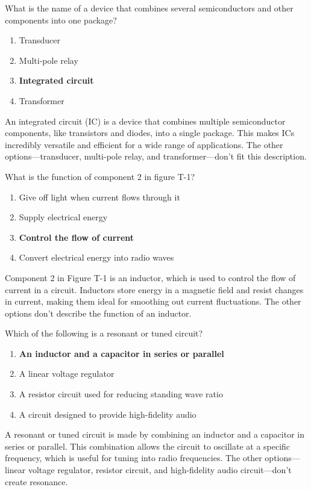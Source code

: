 \begin{tcolorbox}[colback=gray!10!white,colframe=black!75!black,title={T6D09}]
What is the name of a device that combines several semiconductors and other components into one package?
\begin{enumerate}[label=\Alph*),noitemsep]
    \item Transducer
    \item Multi-pole relay
    \item \textbf{Integrated circuit}
    \item Transformer
\end{enumerate}
\end{tcolorbox}
An integrated circuit (IC) is a device that combines multiple semiconductor components, like transistors and diodes, into a single package. This makes ICs incredibly versatile and efficient for a wide range of applications. The other options—transducer, multi-pole relay, and transformer—don’t fit this description.

\begin{tcolorbox}[colback=gray!10!white,colframe=black!75!black,title={T6D10}]
What is the function of component 2 in figure T-1?
\begin{enumerate}[label=\Alph*),noitemsep]
    \item Give off light when current flows through it
    \item Supply electrical energy
    \item \textbf{Control the flow of current}
    \item Convert electrical energy into radio waves
\end{enumerate}
\end{tcolorbox}
Component 2 in Figure T-1 is an inductor, which is used to control the flow of current in a circuit. Inductors store energy in a magnetic field and resist changes in current, making them ideal for smoothing out current fluctuations. The other options don’t describe the function of an inductor.

\begin{tcolorbox}[colback=gray!10!white,colframe=black!75!black,title={T6D11}]
Which of the following is a resonant or tuned circuit?
\begin{enumerate}[label=\Alph*),noitemsep]
    \item \textbf{An inductor and a capacitor in series or parallel}
    \item A linear voltage regulator
    \item A resistor circuit used for reducing standing wave ratio
    \item A circuit designed to provide high-fidelity audio
\end{enumerate}
\end{tcolorbox}
A resonant or tuned circuit is made by combining an inductor and a capacitor in series or parallel. This combination allows the circuit to oscillate at a specific frequency, which is useful for tuning into radio frequencies. The other options—linear voltage regulator, resistor circuit, and high-fidelity audio circuit—don’t create resonance.

